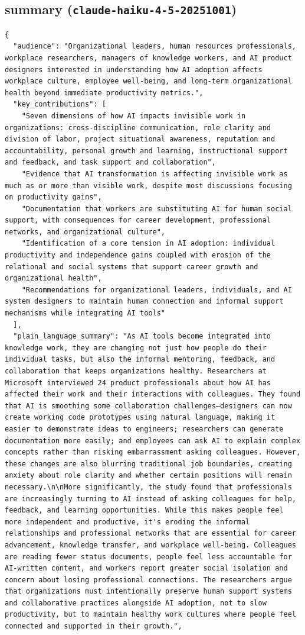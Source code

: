 \documentclass[11pt]{article}
\begin{document}
\subsection*{summary (\texttt{claude-haiku-4-5-20251001})}
\begin{verbatim}
{
  "audience": "Organizational leaders, human resources professionals, workplace researchers, managers of knowledge workers, and AI product designers interested in understanding how AI adoption affects workplace culture, employee well-being, and long-term organizational health beyond immediate productivity metrics.",
  "key_contributions": [
    "Seven dimensions of how AI impacts invisible work in organizations: cross-discipline communication, role clarity and division of labor, project situational awareness, reputation and accountability, personal growth and learning, instructional support and feedback, and task support and collaboration",
    "Evidence that AI transformation is affecting invisible work as much as or more than visible work, despite most discussions focusing on productivity gains",
    "Documentation that workers are substituting AI for human social support, with consequences for career development, professional networks, and organizational culture",
    "Identification of a core tension in AI adoption: individual productivity and independence gains coupled with erosion of the relational and social systems that support career growth and organizational health",
    "Recommendations for organizational leaders, individuals, and AI system designers to maintain human connection and informal support mechanisms while integrating AI tools"
  ],
  "plain_language_summary": "As AI tools become integrated into knowledge work, they are changing not just how people do their individual tasks, but also the informal mentoring, feedback, and collaboration that keeps organizations healthy. Researchers at Microsoft interviewed 24 product professionals about how AI has affected their work and their interactions with colleagues. They found that AI is smoothing some collaboration challenges—designers can now create working code prototypes using natural language, making it easier to demonstrate ideas to engineers; researchers can generate documentation more easily; and employees can ask AI to explain complex concepts rather than risking embarrassment asking colleagues. However, these changes are also blurring traditional job boundaries, creating anxiety about role clarity and whether certain positions will remain necessary.\n\nMore significantly, the study found that professionals are increasingly turning to AI instead of asking colleagues for help, feedback, and learning opportunities. While this makes people feel more independent and productive, it's eroding the informal relationships and professional networks that are essential for career advancement, knowledge transfer, and workplace well-being. Colleagues are reading fewer status documents, people feel less accountable for AI-written content, and workers report greater social isolation and concern about losing professional connections. The researchers argue that organizations must intentionally preserve human support systems and collaborative practices alongside AI adoption, not to slow productivity, but to maintain healthy work cultures where people feel connected and supported in their growth.",

\end{verbatim}
\end{document}
